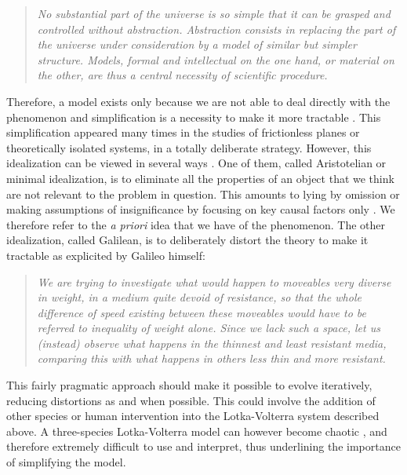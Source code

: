 \documentclass[a4paper,12pt,twoside,onecolumn,openright,final,oldfontcommands]{memoir}
\begin{document}
\begin{quote}
\emph{No substantial part of the universe is so simple that it can be
grasped and controlled without abstraction. Abstraction consists in
replacing the part of the universe under consideration by a model of
similar but simpler structure. Models, formal and intellectual on the
one hand, or material on the other, are thus a central necessity of
scientific procedure.}\\
\citep{rosenblueth1945role}
\end{quote}

Therefore, a model exists only because we are not able to deal directly
with the phenomenon and simplification is a necessity to make it more
tractable \citep{potochnik2017idealization}. This simplification
appeared many times in the studies of frictionless planes or
theoretically isolated systems, in a totally deliberate strategy.
However, this idealization can be viewed in several ways
\citep{weisberg2007three}. One of them, called Aristotelian or minimal
idealization, is to eliminate all the properties of an object that we
think are not relevant to the problem in question. This amounts to lying
by omission or making assumptions of insignificance by focusing on key
causal factors only \citep{frigg2020models}. We therefore refer to the
\emph{a priori} idea that we have of the phenomenon. The other
idealization, called Galilean, is to deliberately distort the theory to
make it tractable as explicited by Galileo himself:

\begin{quote}
\emph{We are trying to investigate what would happen to moveables very
diverse in weight, in a medium quite devoid of resistance, so that the
whole difference of speed existing between these moveables would have to
be referred to inequality of weight alone. Since we lack such a space,
let us (instead) observe what happens in the thinnest and least
resistant media, comparing this with what happens in others less thin
and more resistant.}
\end{quote}

This fairly pragmatic approach should make it possible to evolve
iteratively, reducing distortions as and when possible. This could
involve the addition of other species or human intervention into the
Lotka-Volterra system described above. A three-species Lotka-Volterra
model can however become chaotic \citep{flake1998computational}, and
therefore extremely difficult to use and interpret, thus underlining the
importance of simplifying the model.
\end{document}
